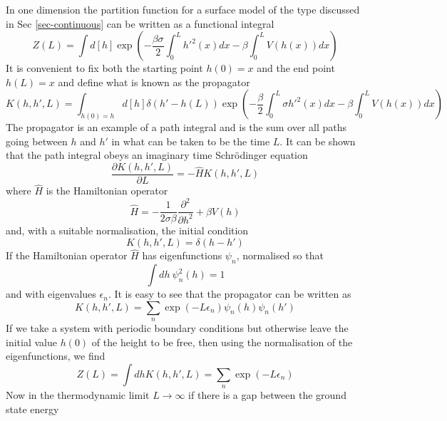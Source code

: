 In one dimension the partition function for a surface model of the type discussed in Sec \ref{sec-continuous} can be written as a functional integral  
\begin{equation}
    Z(L)  = \int d[h]\exp\left(-\frac{\beta\sigma}{2}\int_0^L h'^2(x) dx -\beta\int_0^L  V(h(x)) dx\right)
\end{equation}
It is convenient to fix both the starting point $h(0)=x$ and the end point $h(L)=x$ and define what is known as the propagator
\begin{equation}
    K(h,h',L)=\int_{h(0)=h} d[h] \delta(h' -h(L)) \exp\left(-\frac{\beta}{2}\int_0^L \sigma h'^2(x) dx -\beta \int_0^L  V(h(x)) dx\right)
    \label{prog}
\end{equation}
The propagator is an example of a path integral and is the sum over all paths going between 
$h$ and $h'$ in what can be taken to be the time $L$.  It can be shown \cite{matsubara_new_1955,h_arthur_weldon_scalar_1989} that the path integral obeys an imaginary time Schr\"odinger equation
\begin{equation}
    \frac{\partial  K(h,h',L)}{\partial L} = -\hat H K(h,h',L)
\end{equation}
where $\hat H$ is the Hamiltonian operator
\begin{equation}
    \hat H = -\frac{1}{2\sigma\beta}\frac{\partial^2 }{\partial h^2} + \beta V(h)
\end{equation}
and, with a suitable normalisation, the initial condition
\begin{equation}
    K(h,h',L)=\delta(h-h')
\end{equation}
If the Hamiltonian operator $\hat H$ has eigenfunctions $\psi_n$, normalised so that
\begin{equation}
    \int dh \ \psi^2_n(h) = 1
\end{equation}
 and with eigenvalues $\epsilon_n$. It is easy to see that the propagator can be written as
\begin{equation}
    K(h,h',L)= \sum_n \exp(-L\epsilon_n)\psi_n(h)\psi_n(h')
\end{equation}
If we take a system with periodic boundary conditions but otherwise leave the initial value $h(0)$ of the height to be free, then using the normalisation of the eigenfunctions, we find
\begin{equation}
    Z(L) = \int dh K(h,h',L) = \sum_n \exp(-L\epsilon_n)
\end{equation}
Now in the thermodynamic limit $L\to\infty$ if there is a gap between the ground state energy
